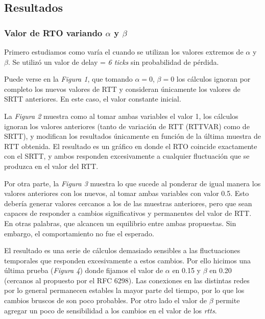 \subsection{Resultados}

    \subsubsection{Valor de RTO variando $\alpha$ y $\beta$}
    
        Primero estudiamos como var\'ia el \rto{} cuando se utilizan los
        valores extremos de $\alpha$ y $\beta$. Se utiliz\'o un valor 
        de delay = \textit{6 ticks} sin probabilidad de p\'erdida.

        Puede verse en la \textit{Figura 1}, que tomando $\alpha=0$, 
        $\beta=0$ los cálculos ignoran por completo los nuevos 
        valores de RTT y consideran únicamente los valores de SRTT
        anteriores. En este caso, el valor constante inicial.

        La \textit{Figura 2} muestra como al tomar ambas variables el valor
        1, los cálculos ignoran los valores anteriores (tanto de variación
        de RTT (RTTVAR) como de SRTT), y modifican los resultados
        únicamente en función de la última muestra de RTT obtenida. El
        resultado es un gráfico en donde el RTO coincide exactamente con
        el SRTT, y ambos responden excesivamente a cualquier fluctuación
        que se produzca en el valor del RTT.
    
        Por otra parte, la \textit{Figura 3} muestra lo que sucede al 
        ponderar de igual manera los valores anteriores con los nuevos, al
        tomar ambas variables con valor 0.5. Esto debería generar valores
        cercanos a los de las muestras anteriores, pero que sean capaces
        de responder a cambios significativos y permanentes del valor de
        RTT. En otras palabras, que alcancen un equilibrio entre ambas
        propuestas. Sin embargo, el comportamiento no fue el esperado. 
        
        El resultado es una serie de cálculos demasiado sensibles a las
        fluctuaciones temporales que responden excesivamente a estos
        cambios. Por ello hicimos una \'ultima prueba (\textit{Figura 4})
        donde fijamos el valor de $\alpha$ en 0.15 y $\beta$ en 0.20 
        (cercanos al propuesto por el RFC 6298).
        Las conexiones en las distintas redes por lo general permanecen
        estables la mayor parte del tiempo, por lo que los cambios bruscos
        de \rtt{} son poco probables. Por otro lado el valor de $\beta$ 
        permite agregar un poco de sensibilidad a los cambios en el valor
        de los \textit{rtts}.

